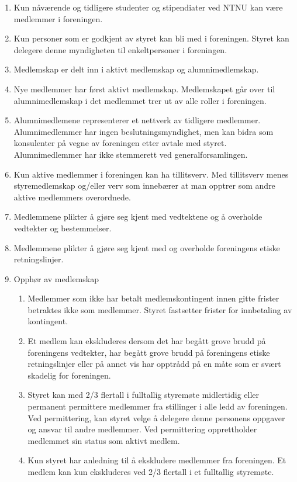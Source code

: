 \documentclass[a4paper,11pt,titlepage]{article}
\begin{document}
\begin{enumerate}
\item Kun nåværende og tidligere studenter og stipendiater ved NTNU kan være medlemmer i foreningen.
\item Kun personer som er godkjent av styret kan bli med i foreningen. Styret kan delegere denne myndigheten til enkeltpersoner i foreningen.
\item Medlemskap er delt inn i aktivt medlemskap og alumnimedlemskap. 
\item Nye medlemmer har først aktivt medlemskap. Medlemskapet går over til alumnimedlemskap i det medlemmet trer ut av alle roller i foreningen. 
\item Alumnimedlemene representerer et nettverk av tidligere medlemmer. Alumnimedlemmer har ingen beslutningsmyndighet, men kan bidra som konsulenter på vegne av foreningen etter avtale med styret. Alumnimedlemmer har ikke stemmerett ved generalforsamlingen.
\item Kun aktive medlemmer i foreningen kan ha tillitsverv. Med tillitsverv menes styremedlemskap og/eller verv som innebærer at man opptrer som andre aktive medlemmers overordnede.
\item Medlemmene plikter å gjøre seg kjent med vedtektene og å overholde vedtekter og bestemmelser.
\item Medlemmene plikter å gjøre seg kjent med og overholde foreningens etiske retningslinjer.
\item Opphør av medlemskap
\begin{enumerate}
\item Medlemmer som ikke har betalt medlemskontingent innen gitte frister betraktes ikke som medlemmer. Styret fastsetter frister for innbetaling av kontingent.
\item Et medlem kan ekskluderes dersom det har begått grove brudd på foreningens vedtekter, har begått grove brudd på foreningens etiske retningslinjer eller på annet vis har opptrådd på en måte som er svært skadelig for foreningen.
\item Styret kan med 2/3 flertall i fulltallig styremøte midlertidig eller permanent permittere medlemmer fra stillinger i alle ledd av foreningen. Ved permittering, kan styret velge å delegere denne personens oppgaver og ansvar til andre medlemmer. Ved permittering opprettholder medlemmet sin status som aktivt medlem.
\item Kun styret har anledning til å ekskludere medlemmer fra foreningen. Et medlem kan kun ekskluderes ved 2/3 flertall i et fulltallig styremøte.
\end{enumerate}

\end{enumerate}
\end{document}
